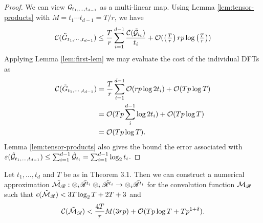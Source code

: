 \begin{proof}
    We can view $\mathcal G_{t_1, \ldots, t_{d-1}}$ as a multi-linear map. Using Lemma \ref{lem:tensor-products} with $M = t_1\cdots t_{d-1} = T/r$, we have
    \[
        \mathcal C(\tilde{G}_{t_1, \cdots, t_{d-1}}) \leq \frac{T}{r} \sum^{d-1}_{i=1} \frac{\mathcal C(\tilde{\mathcal G}_{t_i})}{t_i} + \mathcal O(\left(\tfrac{T}{r}\right)rp\log \left(\tfrac{T}{r}\right))
    \]
    Applying Lemma \ref{lem:first-lem} we may evaluate the cost of the individual DFTs as 
    \begin{align*}
        \mathcal C(\tilde{G}_{t_1, \cdots, t_{d-1}}) 
        &= \frac{T}{r}\sum^{d-1}_{i=1}\mathcal O(rp\log 2t_i) + \mathcal O(Tp \log T)\\
        &= \mathcal O(Tp \sum_i^{d-1}\log 2t_i) + \mathcal O(Tp \log T)\\
        &= \mathcal O(Tp \log T).
    \end{align*}
    Lemma \ref{lem:tensor-products} also gives the bound the error associated with $\varepsilon(\tilde{\mathcal G}_{t_1, \ldots, t_{d-1}}) \le \sum_{i=1}^{d-1}\tilde{\mathcal G}_{t_i} = \sum_{i=1}^{d-1} \log_2 t_i$.
\end{proof}

\begin{proposition}
    Let $t_1, \ldots, t_d$ and $T$ be as in Theorem 3.1. Then we can construct a numerical approximation $\tilde{\mathcal M_{\mathscr{R}}}: \otimes_i \tilde{\mathscr{R}^{t_i}} \otimes_i \tilde{\mathscr{R}^{t_i}} \to \otimes_i \tilde{\mathscr{R}^{t_i}}$ for the convolution function $\mathcal M_{\mathscr{R}}$ such that $\epsilon(\tilde{\mathcal M}_{\mathscr{R}}) < 3T \log_2 T + 2T + 3$ and
    \[
        \mathcal C(\tilde{\mathcal M}_{\mathscr{R}}) < \frac{4T}{r}M(3rp) + \mathcal O(Tp \log T + T p^{1 + \delta}).
    \]
\end{proposition}

